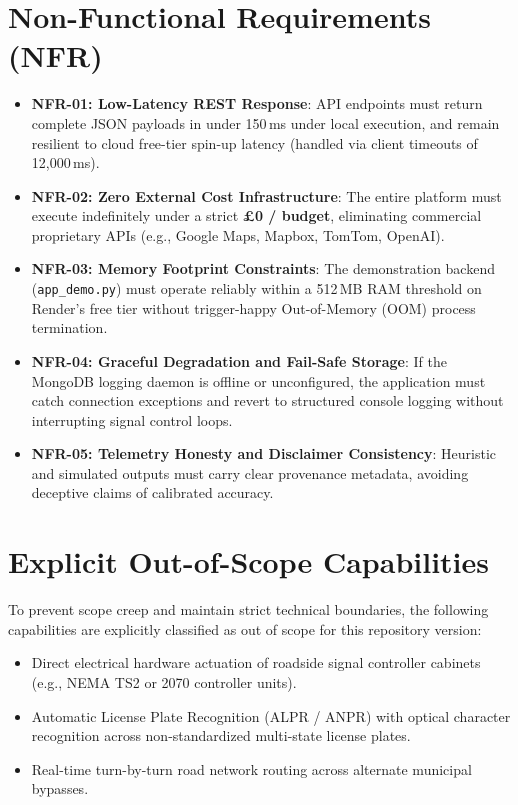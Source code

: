 \documentclass[11pt,a4paper,oneside]{report}
\begin{document}
\section{Non-Functional Requirements (NFR)}
\begin{itemize}[leftmargin=*]
    \item \textbf{NFR-01: Low-Latency REST Response}: API endpoints must return complete JSON payloads in under 150\,ms under local execution, and remain resilient to cloud free-tier spin-up latency (handled via client timeouts of 12,000\,ms).
    \item \textbf{NFR-02: Zero External Cost Infrastructure}: The entire platform must execute indefinitely under a strict \textbf{\pounds 0 /  budget}, eliminating commercial proprietary APIs (e.g., Google Maps, Mapbox, TomTom, OpenAI).
    \item \textbf{NFR-03: Memory Footprint Constraints}: The demonstration backend (\texttt{app\_demo.py}) must operate reliably within a 512\,MB RAM threshold on Render's free tier without trigger-happy Out-of-Memory (OOM) process termination.
    \item \textbf{NFR-04: Graceful Degradation and Fail-Safe Storage}: If the MongoDB logging daemon is offline or unconfigured, the application must catch connection exceptions and revert to structured console logging without interrupting signal control loops.
    \item \textbf{NFR-05: Telemetry Honesty and Disclaimer Consistency}: Heuristic and simulated outputs must carry clear provenance metadata, avoiding deceptive claims of calibrated accuracy.
\end{itemize}

\section{Explicit Out-of-Scope Capabilities}
To prevent scope creep and maintain strict technical boundaries, the following capabilities are explicitly classified as out of scope for this repository version:
\begin{itemize}[leftmargin=*]
    \item Direct electrical hardware actuation of roadside signal controller cabinets (e.g., NEMA TS2 or 2070 controller units).
    \item Automatic License Plate Recognition (ALPR / ANPR) with optical character recognition across non-standardized multi-state license plates.
    \item Real-time turn-by-turn road network routing across alternate municipal bypasses.
\end{itemize}
\end{document}
